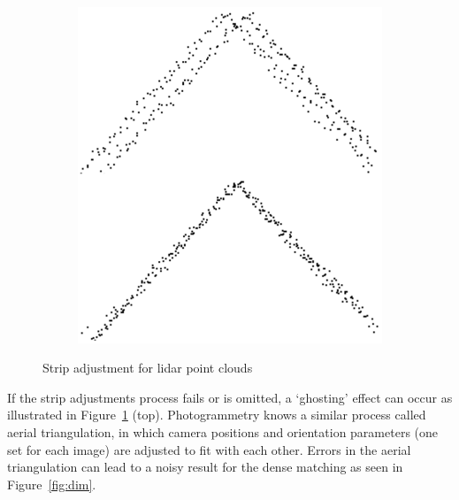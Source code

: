 \begin{figure}
\begin{subfigure}{0.4\linewidth}
		\includegraphics[width=\textwidth]{figs/strip_adjustment.png}
		\label{fig:lidarGableRoof}
	\end{subfigure}
	\caption{Strip adjustment for lidar point clouds}%
\label{fig:lidarStripAdj}
\end{figure}
If the strip adjustments process fails or is omitted, a `ghosting' effect can occur as illustrated in Figure~\ref{fig:lidarGableRoof} (top). 
Photogrammetry knows a similar process called aerial triangulation, in which camera positions and orientation parameters (one set for each image) are adjusted to fit with each other. Errors in the aerial triangulation can lead to a noisy result for the dense matching as seen in Figure~\ref{fig:dim}.
